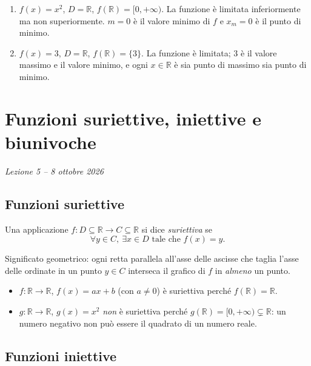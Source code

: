 \documentclass[11pt,a4paper]{article}
\begin{document}
\begin{esempio}
\leavevmode
\begin{enumerate}
    \item $f(x) = x^2$, $D = \mathbb{R}$, $f(\mathbb{R}) = [0, +\infty)$. La funzione è limitata inferiormente ma non superiormente. $m = 0$ è il valore minimo di $f$ e $x_m = 0$ è il punto di minimo.
    \item $f(x) = 3$, $D = \mathbb{R}$, $f(\mathbb{R}) = \{3\}$. La funzione è limitata; $3$ è il valore massimo e il valore minimo, e ogni $x \in \mathbb{R}$ è sia punto di massimo sia punto di minimo.
\end{enumerate}
\end{esempio}

\section[Funzioni suriettive, iniettive e biunivoche (Lezione 5 -- 8 ottobre 2026)]{Funzioni suriettive, iniettive e biunivoche}
\noindent\emph{Lezione 5 -- 8 ottobre 2026}
\subsection{Funzioni suriettive}

\begin{definizione}
Una applicazione $f : D \subseteq \mathbb{R} \to C \subseteq \mathbb{R}$ si dice \emph{suriettiva} se
\[
\forall y \in C, \ \exists x \in D \text{ tale che } f(x) = y.
\]
\end{definizione}

Significato geometrico: ogni retta parallela all'asse delle ascisse che taglia l'asse delle ordinate in un punto $y \in C$ interseca il grafico di $f$ in \emph{almeno} un punto.

\begin{esempio}
\leavevmode
\begin{itemize}
    \item $f : \mathbb{R} \to \mathbb{R}$, $f(x) = ax + b$ (con $a \neq 0$) è suriettiva perché $f(\mathbb{R}) = \mathbb{R}$.
    \item $g : \mathbb{R} \to \mathbb{R}$, $g(x) = x^2$ \emph{non} è suriettiva perché $g(\mathbb{R}) = [0, +\infty) \subsetneq \mathbb{R}$: un numero negativo non può essere il quadrato di un numero reale.
\end{itemize}
\end{esempio}

\subsection{Funzioni iniettive}
\end{document}
